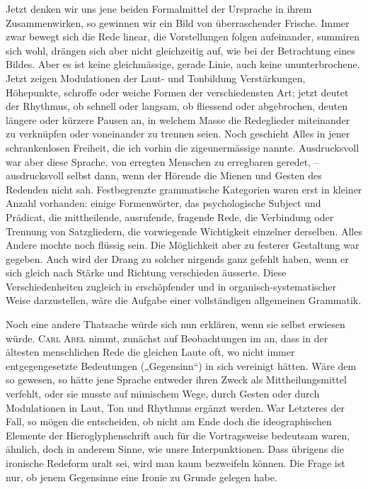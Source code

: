\largerpage[1]Jetzt denken wir uns jene beiden Formalmittel der Ursprache in ihrem Zusammenwirken, so gewinnen wir ein Bild von überraschender Frische. Immer zwar bewegt sich die Rede linear, die Vorstellungen folgen aufeinander, summiren sich wohl, drängen sich aber nicht gleichzeitig auf, wie bei der Betrachtung eines Bildes. Aber es ist keine gleichmässige, gerade Linie, auch keine ununterbrochene. Jetzt zeigen Modulationen der Laut- und Tonbildung Verstärkungen, Höhepunkte, schroffe oder weiche Formen der verschiedensten Art; jetzt deutet der Rhythmus, ob schnell oder langsam, ob fliessend oder abgebrochen, deuten längere oder kürzere Pausen an, in welchem Masse die Redeglieder miteinander zu verknüpfen oder voneinander zu trennen seien. Noch geschieht Alles in jener schrankenlosen Freiheit, die ich vorhin die zigeunermässige nannte. Ausdrucksvoll war aber diese Sprache, von erregten Menschen zu erregbaren geredet, – ausdrucksvoll selbst dann, wenn der Hörende die Mienen und Gesten des Redenden nicht sah. Festbegrenzte grammatische Kategorien waren erst in kleiner Anzahl vorhanden: einige Formenwörter, das psychologische Subject und Prädicat, die mittheilende, ausrufende, fragende Rede, die Verbindung oder Trennung von Satzgliedern, die vorwiegende Wichtigkeit einzelner derselben. Alles Andere mochte noch flüssig sein. Die Möglichkeit aber zu festerer Gestaltung war gegeben. Auch wird der Drang zu solcher nirgends ganz gefehlt haben, wenn er sich gleich nach Stärke und \label{fp.365} Richtung verschieden äusserte. Diese Verschiedenheiten zugleich in erschöpfender und in organisch-systematischer Weise darzustellen, wäre die Aufgabe einer vollständigen allgemeinen Grammatik.

Noch eine andere Thatsache würde sich nun erklären, wenn sie selbst erwiesen würde. \textsc{Carl Abel} nimmt, zunächst auf Beobachtungen im  \label{sp.381}  an, dass in der ältesten menschlichen Rede die gleichen Laute oft, wo nicht immer entgegengesetzte Bedeutungen („Gegensinn“) in sich vereinigt hätten. Wäre dem so gewesen, so hätte jene Sprache entweder ihren Zweck als Mittheilungsmittel verfehlt, oder sie musste auf mimischem Wege, durch Gesten oder durch Modulationen in Laut, Ton und Rhythmus ergänzt werden. War Letzteres der Fall, so mögen die  entscheiden, ob nicht am Ende doch die  ideographischen Elemente der Hieroglyphenschrift auch für die Vortragsweise bedeutsam waren, ähnlich, doch in anderem Sinne, wie unsre Interpunktionen. Dass übrigens die ironische Redeform uralt sei, wird man kaum bezweifeln können. Die Frage ist nur, ob jenem Gegensinne eine Ironie zu Grunde gelegen habe.

